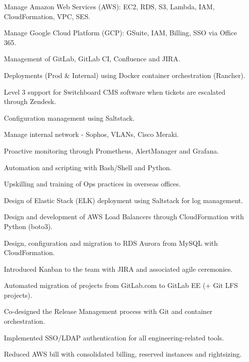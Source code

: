 \begin{experiences}
  {
    \begin{cvitems}
      \item {Manage Amazon Web Services (AWS): EC2, RDS, S3, Lambda, IAM, CloudFormation, VPC, SES.}
      \item {Manage Google Cloud Platform (GCP): GSuite, IAM, Billing, SSO via Office 365.}
      \item {Management of GitLab, GitLab CI, Confluence and JIRA.}
      \item {Deployments (Prod \& Internal) using Docker container orchestration (Rancher).}
      \item {Level 3 support for Switchboard CMS software when tickets are escalated through Zendesk.}
      \item {Configuration management using Saltstack.}
      \item {Manage internal network - Sophos, VLANs, Cisco Meraki.}
      \item {Proactive monitoring through Prometheus, AlertManager and Grafana.}
      \item {Automation and scripting with Bash/Shell and Python.}
      \item {Upskilling and training of Ops practices in overseas offices.}
    \end{cvitems}
  }
  {
    \begin{cvitems}
      \item {Design of Elastic Stack (ELK) deployment using Saltstack for log management.}
      \item {Design and development of AWS Load Balancers through CloudFormation with Python (boto3).}
      \item {Design, configuration and migration to RDS Aurora from MySQL with CloudFormation.}
      \item {Introduced Kanban to the team with JIRA and associated agile ceremonies.}
      \item {Automated migration of projects from GitLab.com to GitLab EE (+ Git LFS projects).}
      \item {Co-designed the Release Management process with Git and container orchestration.}
      \item {Implemented SSO/LDAP authentication for all engineering-related tools.}
      \item {Reduced AWS bill with consolidated billing, reserved instances and rightsizing.}
    \end{cvitems}
  }


\end{experiences}
